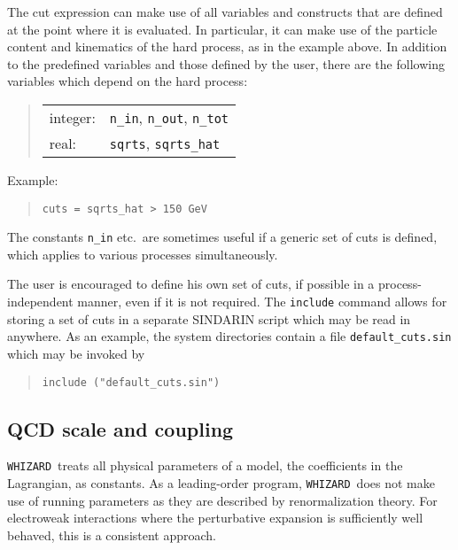 \documentclass[12pt]{book}
\newcommand{\ttt}[1]{\texttt{#1}}
\newcommand{\whizard}{\texttt{WHIZARD}}
\begin{document}
The cut expression can make use of all variables and constructs that are
defined at the point where it is evaluated.  In particular, it can make use of
the particle content and kinematics of the hard process, as in the example
above.  In addition to the predefined variables and those defined by the user,
there are the following variables which depend on the hard process:
\begin{quote}
\begin{tabular}{ll}
integer: & \ttt{n\_in}, \ttt{n\_out}, \ttt{n\_tot} \\
real: & \ttt{sqrts}, \ttt{sqrts\_hat}
\end{tabular}
\end{quote}
Example:
\begin{quote}
\begin{footnotesize}
\begin{verbatim}
cuts = sqrts_hat > 150 GeV
\end{verbatim}
\end{footnotesize}
\end{quote}
The constants \ttt{n\_in} etc.\ are sometimes useful if a generic set of cuts
is defined, which applies to various processes simultaneously.

The user is encouraged to define his own set of cuts, if possible in a
process-independent manner, even if it is not required.  The \ttt{include}
command allows for storing a set of cuts in a separate SINDARIN script which
may be read in anywhere.  As an example, the system directories contain a file
\verb|default_cuts.sin| which may be invoked by
\begin{quote}
\begin{footnotesize}
\begin{verbatim}
include ("default_cuts.sin")
\end{verbatim}
\end{footnotesize}
\end{quote}


\subsection{QCD scale and coupling}

\whizard\ treats all physical parameters of a model, the coefficients in the
Lagrangian, as constants.  As a leading-order program, \whizard\ does not make
use of running parameters as they are described by renormalization theory.
For electroweak interactions where the perturbative expansion is sufficiently
well behaved, this is a consistent approach.
\end{document}
